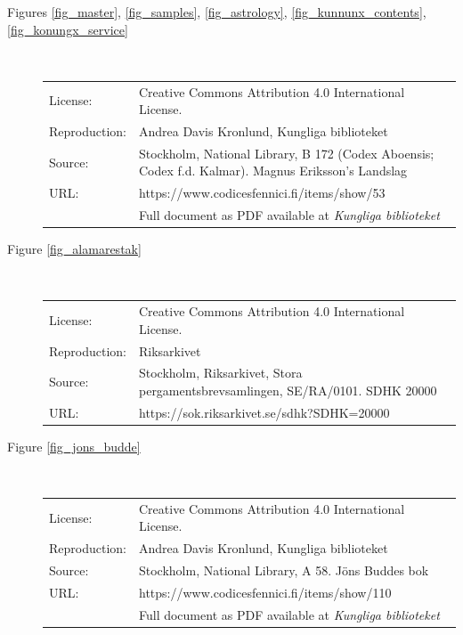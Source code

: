 \documentclass[a4paper]{article}
\begin{document}
\begin{description}
\item [Figures \ref{fig_master}, \ref{fig_samples},
  \ref{fig_astrology}, \ref{fig_kunnunx_contents},
  \ref{fig_konungx_service}] \mbox{} \\

  \begin{tabular}{p{2cm}p{10cm}}
    License: & Creative Commons Attribution 4.0 International License.
    \\
    Reproduction: & Andrea Davis Kronlund, Kungliga biblioteket \\
    Source: & 
    Stockholm, National Library, B 172 (Codex Aboensis; Codex f.d.
    Kalmar). Magnus Eriksson’s Landslag \\
    URL: & https://www.codicesfennici.fi/items/show/53 \\
    & Full document as PDF available at \emph{Kungliga biblioteket} 
  \end{tabular}


  \item [Figure \ref{fig_alamarestak}]     \mbox{} \\

\begin{tabular}{p{2cm}p{10cm}}
      
      License: &  Creative Commons Attribution 4.0 International
      License.  \\
      Reproduction: & Riksarkivet \\
      Source: &     Stockholm, Riksarkivet, Stora
      pergamentsbrevsamlingen, SE/RA/0101.  SDHK 20000\\
      URL: & https://sok.riksarkivet.se/sdhk?SDHK=20000 \\
    \end{tabular}


  \item [Figure \ref{fig_jons_budde}]    \mbox{} \\

  \begin{tabular}{p{2cm}p{10cm}}
    License: & Creative Commons Attribution 4.0 International License.
    \\
    Reproduction: & Andrea Davis Kronlund, Kungliga biblioteket \\
    Source: & Stockholm, National Library, A 58. Jöns Buddes bok \\
    URL: & https://www.codicesfennici.fi/items/show/110 \\
    & Full document as PDF available at \emph{Kungliga biblioteket} 
  \end{tabular}



\end{description}
\end{document}
